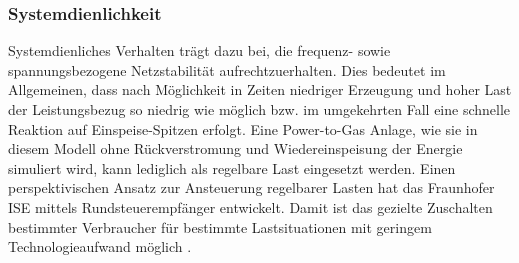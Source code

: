 \documentclass[onecolumn,10pt,titlepage]{article}
\begin{document}
\subsubsection{Systemdienlichkeit}
Systemdienliches Verhalten trägt dazu bei, die frequenz- sowie spannungsbezogene Netzstabilität aufrechtzuerhalten. Dies bedeutet im Allgemeinen, dass nach Möglichkeit in Zeiten niedriger Erzeugung und hoher Last der Leistungsbezug so niedrig wie möglich bzw. im umgekehrten Fall eine schnelle Reaktion auf Einspeise-Spitzen erfolgt. 
Eine Power-to-Gas Anlage, wie sie in diesem Modell ohne Rückverstromung und Wiedereinspeisung der Energie simuliert wird, kann lediglich als regelbare Last eingesetzt werden. Einen perspektivischen Ansatz zur Ansteuerung regelbarer Lasten hat das Fraunhofer ISE mittels Rundsteuerempfänger entwickelt. Damit ist das gezielte Zuschalten bestimmter Verbraucher für bestimmte Lastsituationen mit geringem Technologieaufwand möglich \cite{Schneider2018}.

%
\end{document}
